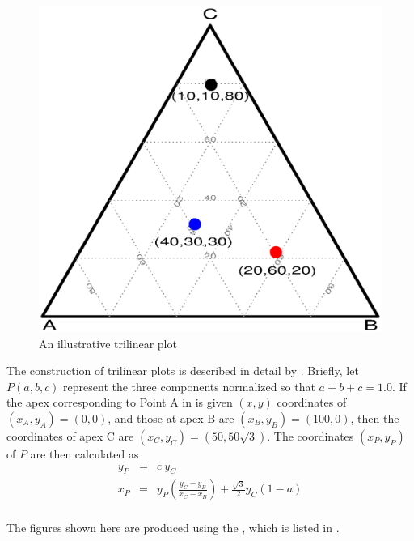 \begin{figure}[htb]
  \centering
  \includegraphics[scale=.6]{ch3/fig/tripdemo2}
  \caption[A trilinear plot]{An illustrative trilinear plot}\label{fig:tripdemo2}
\end{figure}

The construction of trilinear plots is described in detail
by \citet{FedenczukBercov:91}.
Briefly, let $P(a, b, c)$ represent the three components  normalized so
that $a + b + c = 1.0$.
If the apex corresponding to Point A in 
is given $(x, y)$ coordinates of $(x_A, y_A) = (0, 0)$,
and those at apex B are $(x_B, y_B) = (100, 0)$,
then the coordinates of apex C are $(x_C, y_C) = (50, 50\sqrt{3})$.
The coordinates $(x_P, y_P)$  of $P$ are then calculated as
\begin{eqnarray*}
y_P & = & c \: y_C \\
x_P & = & y_P \left( \frac{y_C - y_B}{x_C - x_B} \right)
+ \frac{\sqrt{3}}{2} y_C (1 - a) \\
\end{eqnarray*}

The figures shown here are produced using the ,
which is listed in .

